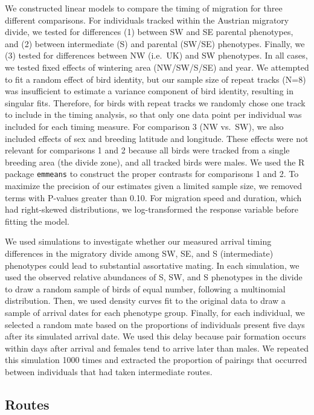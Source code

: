 \documentclass[a4paper, twoside]{templates/ociamthesis}
\begin{document}
We constructed linear models to compare the timing of migration for three different comparisons. For individuals tracked within the Austrian migratory divide, we tested for differences (1) between SW and SE parental phenotypes, and (2) between intermediate (S) and parental (SW/SE) phenotypes. Finally, we (3) tested for differences between NW (i.e.~UK) and SW phenotypes. In all cases, we tested fixed effects of wintering area (NW/SW/S/SE) and year. We attempted to fit a random effect of bird identity, but our sample size of repeat tracks (N=8) was insufficient to estimate a variance component of bird identity, resulting in singular fits. Therefore, for birds with repeat tracks we randomly chose one track to include in the timing analysis, so that only one data point per individual was included for each timing measure. For comparison 3 (NW vs.~SW), we also included effects of sex and breeding latitude and longitude. These effects were not relevant for comparisons 1 and 2 because all birds were tracked from a single breeding area (the divide zone), and all tracked birds were males. We used the R package \texttt{emmeans} \autocite{lenthEmmeansEstimatedMarginal2019} to construct the proper contrasts for comparisons 1 and 2. To maximize the precision of our estimates given a limited sample size, we removed terms with P-values greater than 0.10. For migration speed and duration, which had right-skewed distributions, we log-transformed the response variable before fitting the model.

We used simulations to investigate whether our measured arrival timing differences in the migratory divide among SW, SE, and S (intermediate) phenotypes could lead to substantial assortative mating. In each simulation, we used the observed relative abundances of S, SW, and S phenotypes in the divide to draw a random sample of birds of equal number, following a multinomial distribution. Then, we used density curves fit to the original data to draw a sample of arrival dates for each phenotype group. Finally, for each individual, we selected a random mate based on the proportions of individuals present five days after its simulated arrival date. We used this delay because pair formation occurs within days after arrival \autocite{bairleinUeberBiologieSuedwestdeutschen1978} and females tend to arrive later than males. We repeated this simulation 1000 times and extracted the proportion of pairings that occurred between individuals that had taken intermediate routes.

\hypertarget{routes}{%
\subsection{Routes}\label{routes}}
\end{document}
